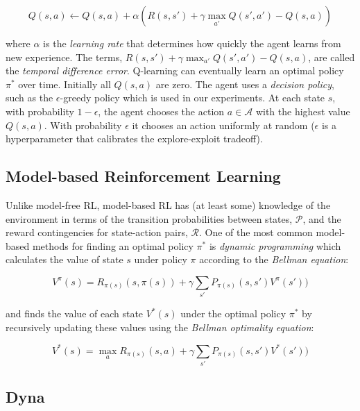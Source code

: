 \documentclass[letterpaper]{article}
\begin{document}
\begin{equation}
Q(s,a) \leftarrow Q(s,a) + \alpha (R(s, s') + \gamma \max_{a'} Q(s', a') - Q(s,a))
\end{equation}

\noindent
where $\alpha$ is the \textit{learning rate} that determines how quickly the agent learns from new experience. The terms, $R(s, s') + \gamma \max_{a'} Q(s', a') - Q(s,a)$, are called the \textit{temporal difference error}. Q-learning can eventually learn an optimal policy $\pi^*$ over time. Initially all $Q(s,a)$ are zero. The agent uses a \textit{decision policy}, such as the $\epsilon$-greedy policy which is used in our experiments. At each state $s$, with probability $1 - \epsilon$, the agent chooses the action $a \in \mathcal{A}$ with the highest value $Q(s,a)$. With probability $\epsilon$ it chooses an action uniformly at random ($\epsilon$ is a hyperparameter that calibrates the explore-exploit tradeoff).
 
\subsection{Model-based Reinforcement Learning}

Unlike model-free RL, model-based RL has (at least some) knowledge of the environment in terms of the transition probabilities between states, $\mathcal{P}$, and the reward contingencies for state-action pairs, $\mathcal{R}$. One of the most common model-based methods for finding an optimal policy $\pi^*$ is \textit{dynamic programming} which calculates the value of state $s$ under policy $\pi$ according to the \textit{Bellman equation}:

\begin{equation}
V^{\pi}(s) = R_{\pi(s)}(s,\pi(s)) + \gamma \sum\limits_{s'} P_{\pi(s)}(s,s')V^{\pi}(s'))
\end{equation}

\noindent
and finds the value of each state $V^{*}(s)$ under the optimal policy $\pi^*$ by recursively updating these values using the \textit{Bellman optimality equation}:

\begin{equation}
V^{*}(s) = \max_a R_{\pi(s)}(s,a) + \gamma \sum\limits_{s'} P_{\pi(s)}(s,s')V^{*}(s'))
\end{equation}

\subsection{Dyna}
\end{document}
